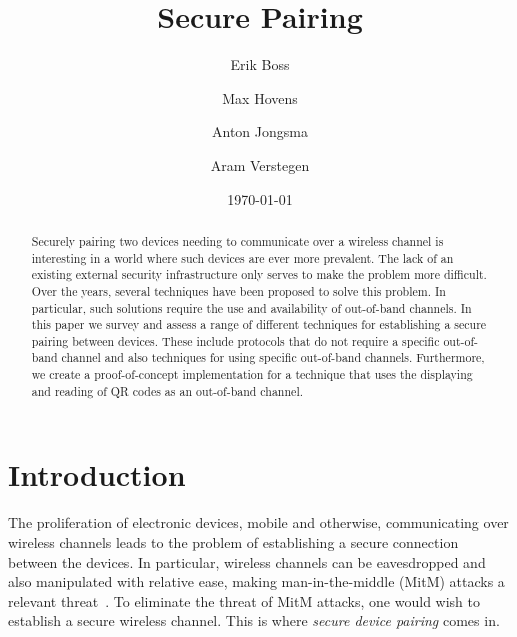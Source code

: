 \documentclass[conference, 11pt]{sty/IEEEtran}
\title{Secure Pairing}
\author{Erik Boss \and Max Hovens \and Anton Jongsma \and Aram Verstegen}
\date{\today}
\begin{document}
\maketitle

\begin{abstract}

Securely pairing two devices needing to communicate over a wireless channel is interesting in a world where such devices are ever more prevalent.
The lack of an existing external security infrastructure only serves to make the problem more difficult.
Over the years, several techniques have been proposed to solve this problem.
In particular, such solutions require the use and availability of out-of-band channels.
In this paper we survey and assess a range of different techniques for establishing a secure pairing between devices.
These include protocols that do not require a specific out-of-band channel and also techniques for using specific out-of-band channels.
Furthermore, we create a proof-of-concept implementation for a technique that uses the displaying and reading of QR codes as an out-of-band channel.

\end{abstract}

\section{Introduction}
\label{sec:introduction}

The proliferation of electronic devices, mobile and otherwise, communicating over wireless channels leads to the problem of establishing a secure connection between the devices.
In particular, wireless channels can be eavesdropped and also manipulated with relative ease, making man-in-the-middle (MitM) attacks a relevant threat~\cite{kumar2009comparative}.
To eliminate the threat of MitM attacks, one would wish to establish a secure wireless channel.
This is where \emph{secure device pairing} comes in.
\end{document}
